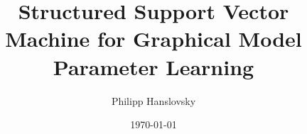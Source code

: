 




\title{Structured Support Vector Machine for Graphical Model Parameter Learning}

\author{Philipp Hanslovsky}
\date{\today}



\maketitle





\appendix %
\setcounter{finalframe}{\value{framenumber}}

% 

\setcounter{framenumber}{\value{finalframe}}





